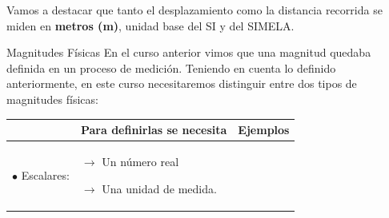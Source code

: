 

Vamos a destacar que tanto el desplazamiento como la distancia recorrida se miden en {\bf metros (m)}, unidad base del SI y del SIMELA.
\bigskip



\begin{magnitud}{Magnitudes Físicas}
  En el curso anterior vimos que una magnitud quedaba definida en un proceso de medición. Teniendo en cuenta lo definido anteriormente, en este curso  necesitaremos distinguir entre dos tipos de magnitudes físicas:
  \begin{center}
  \begin{tabular}{|l|p{6cm}|p{6cm}|}
    \hline
    & Para definirlas se necesita        & Ejemplos\\
    \hline
    $\bullet$ Escalares:& $\rightarrow$ Un número real

                          $\rightarrow$ Una unidad de medida.
                          

\end{tabular}
\end{center}
\end{magnitud}
